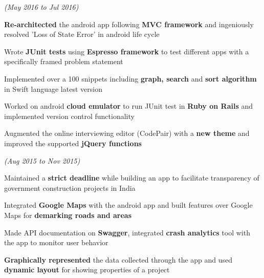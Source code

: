 \documentclass[a4paper]{deedy-resume} %
\begin{document}
\hfill {\textit{\small(May 2016 to Jul 2016)}}\\

\begin{tightitemize}
\item \textbf{Re-architected} the android app following \textbf{MVC framework} and ingeniously resolved 'Loss of State Error' in android life cycle
\item Wrote \textbf{JUnit tests} using \textbf{Espresso framework} to test different apps with a specifically framed problem statement
\item Implemented over a 100 snippets including  \textbf{ graph, search} and \textbf{sort algorithm} in Swift language latest version
\item Worked on android \textbf{cloud emulator} to run JUnit test in \textbf{Ruby on Rails} and implemented version control functionality
\item Augmented the online interviewing editor (CodePair) with a \textbf{new theme} and improved the supported \textbf{jQuery functions}
\end{tightitemize}
\microspace

\hfill {\textit{\small(Aug 2015 to Nov 2015)}}\


\begin{tightitemize}
\item Maintained a  \textbf{strict deadline} while building an app to facilitate transparency of government construction projects in India
\item Integrated \textbf{Google Maps} with the android app and built features over Google Maps for \textbf{demarking roads and areas}
\item Made API documentation on \textbf{Swagger}, integrated \textbf{crash analytics} tool with the app to monitor user behavior
\item \textbf{Graphically represented} the data collected through the app and used \textbf{dynamic layout} for showing properties of a project
\end{tightitemize}
\microspace


\end{document}
